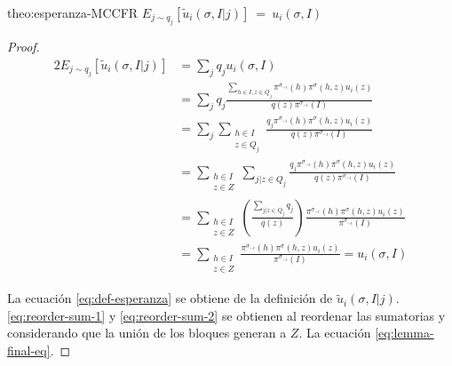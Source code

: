 \begin{reptheorem}{theo:esperanza-MCCFR}
$E_{j \sim q_j} [\tilde{u}_i(\sigma, I | j)]\ =\ u_i(\sigma, I)$
\end{reptheorem}

\begin{proof}
\begin{alignat}{2}
    E_{j \sim q_j}[\tilde{u}_i(\sigma, I | j)] & = \sum_{j} {q_j u_i(\sigma, I)} \\
    & = \sum_{j} { q_j \frac{\sum_{h \in I, z \in Q_j} \pi^{\sigma_{-i}}(h) \pi^{\sigma}(h, z) u_i(z)}{q(z) \pi^{\sigma_{-i}}(I)}} \\ \label{eq:def-esperanza}
    & = \sum_{j} \sum_{ \substack{h \in I \\ z \in Q_j}} \frac{q_j \pi^{\sigma_{-i}}(h) \pi^{\sigma}(h, z) u_i(z)}{ q(z) \pi^{\sigma_{-i}}(I)} \\ \label{eq:reorder-sum-1}
    & = \sum_{ \substack{h \in I \\ z \in Z} } \sum_{j | z \in Q_j} \frac{q_j \pi^{\sigma_{-i}}(h) \pi^{\sigma}(h, z) u_i(z)}{ q(z) \pi^{\sigma_{-i}}(I)} \\ \label{eq:reorder-sum-2}
    & = \sum_{ \substack{h \in I \\ z \in Z} } \left(\frac{\sum_{j | z \in Q_j} q_j }{q(z)}\right) \frac{\pi^{\sigma_{-i}}(h) \pi^{\sigma}(h, z) u_i(z)}{\pi^{\sigma_{-i}}(I)} \\
    & = \sum_{ \substack{h \in I \\ z \in Z} } \frac{\pi^{\sigma_{-i}}(h) \pi^{\sigma}(h, z) u_i(z)}{\pi^{\sigma_{-i}}(I)}  = u_i(\sigma, I) \label{eq:lemma-final-eq}
\end{alignat}

La ecuación \ref{eq:def-esperanza} se obtiene de la definición de $\tilde{u}_i(\sigma, I | j)$. \ref{eq:reorder-sum-1} y \ref{eq:reorder-sum-2} se obtienen al reordenar las sumatorias y considerando que la unión de los bloques generan a $Z$. La ecuación \ref{eq:lemma-final-eq}.
\end{proof}
